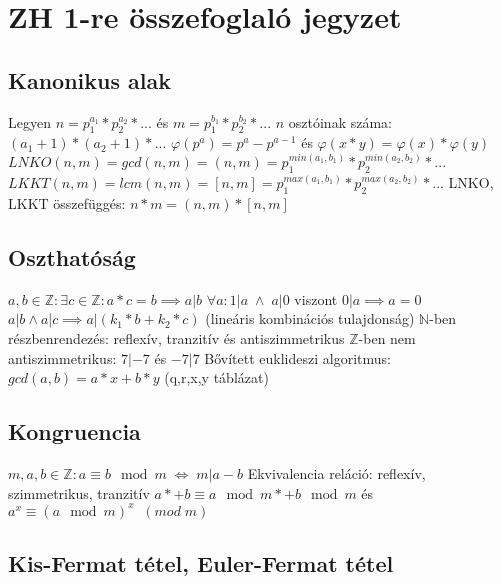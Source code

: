 \documentclass[12pt,a4paper]{article}
\begin{document}
\pagebreak

\section{ZH 1-re összefoglaló jegyzet}

\subsection{Kanonikus alak}

\begin{outline}
	\1 Legyen $n = p_1^{a_1} * p_2^{a_2} * ...$ és $m = p_1^{b_1} * p_2^{b_2} * ...$
	\1 $n$ osztóinak száma: $(a_1+1)*(a_2+1)*...$
	\1 $\varphi(p^a) = p^a - p^{a-1}$ és $\varphi(x*y) = \varphi(x)*\varphi(y)$
	\1 $LNKO(n,m) = gcd(n,m) = (n,m) = p_1^{min(a_1,b_1)} * p_2^{min(a_2,b_2)} * ...$
	\1 $LKKT(n,m) = lcm(n,m) = [n,m] = p_1^{max(a_1,b_1)} * p_2^{max(a_2,b_2)} * ...$
	\1 LNKO, LKKT összefüggés: $n*m = (n,m) * [n,m]$
\end{outline}

\subsection{Oszthatóság}

\begin{outline}
	\1 $a,b \in \mathbb{Z}: \exists c \in \mathbb{Z}: a*c=b \implies a|b$
	\1 $\forall a: 1|a \; \wedge \; a|0$ \;\; viszont $0|a \implies a=0$
	\1 $a|b \wedge a|c \implies a|(k_1*b+k_2*c)$ \;\; (lineáris kombinációs tulajdonság)
	\1 $\mathbb{N}$-ben részbenrendezés: reflexív, tranzitív és antiszimmetrikus
		\2 $\mathbb{Z}$-ben nem antiszimmetrikus: $7|-7$ és $-7|7$
	\1 Bővített euklideszi algoritmus: $gcd(a,b)=a*x+b*y$ \;\;(q,r,x,y táblázat)
\end{outline}

\subsection{Kongruencia}

\begin{outline}
	\1 $m,a,b \in \mathbb{Z}: a \equiv b \mod m \; \Leftrightarrow \; m | a-b$
	\1 Ekvivalencia reláció: reflexív, szimmetrikus, tranzitív
	\1 $a*+b \equiv a \mod m *+ b \mod m$ és $a^x \equiv (a \mod m)^x \;\;(mod \; m)$
\end{outline}

\subsection{Kis-Fermat tétel, Euler-Fermat tétel}
\end{document}
